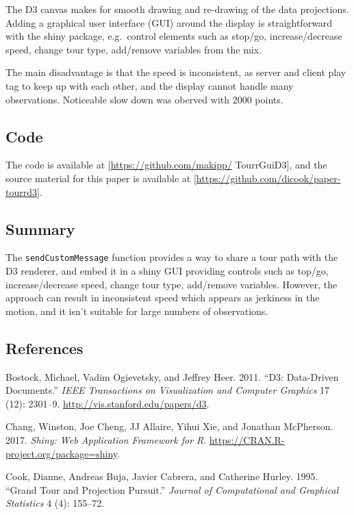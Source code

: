 The D3 canvas makes for smooth drawing and re-drawing of the data
projections. Adding a graphical user interface (GUI) around the display
is straightforward with the shiny package, e.g.~control elements such as
stop/go, increase/decrease speed, change tour type, add/remove variables
from the mix.

The main disadvantage is that the speed is inconsistent, as server and
client play tag to keep up with each other, and the display cannot
handle many observations. Noticeable slow down was oberved with 2000
points.

\subsection{Code}\label{code}

The code is available at {[}\url{https://github.com/makipp/}
TourrGuiD3{]}, and the source material for this paper is available at
{[}\url{https://github.com/dicook/paper-tourrd3}{]}.

\subsection{Summary}\label{summary}

The \texttt{sendCustomMessage} function provides a way to share a tour
path with the D3 renderer, and embed it in a shiny GUI providing
controls such as top/go, increase/decrease speed, change tour type,
add/remove variables. However, the approach can result in inconsistent
speed which appears as jerkiness in the motion, and it isn't suitable
for large numbers of observations.

\subsection{References}\label{references}

\hypertarget{refs}{}
\hypertarget{ref-D3}{}
Bostock, Michael, Vadim Ogievetsky, and Jeffrey Heer. 2011. ``D3:
Data-Driven Documents.'' \emph{IEEE Transactions on Visualization and
Computer Graphics} 17 (12): 2301--9.
\url{http://vis.stanford.edu/papers/d3}.

\hypertarget{ref-shiny}{}
Chang, Winston, Joe Cheng, JJ Allaire, Yihui Xie, and Jonathan
McPherson. 2017. \emph{Shiny: Web Application Framework for R}.
\url{https://CRAN.R-project.org/package=shiny}.

\hypertarget{ref-gt_pp}{}
Cook, Dianne, Andreas Buja, Javier Cabrera, and Catherine Hurley. 1995.
``Grand Tour and Projection Pursuit.'' \emph{Journal of Computational
and Graphical Statistics} 4 (4): 155--72.

